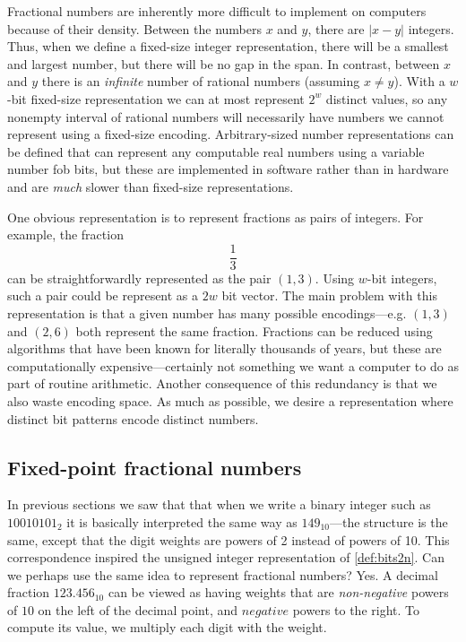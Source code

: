 Fractional numbers are inherently more difficult to implement on
computers because of their density.  Between the numbers $x$ and $y$,
there are $|x-y|$ integers.  Thus, when we define a fixed-size integer
representation, there will be a smallest and largest number, but there
will be no gap in the span.  In contrast, between $x$ and $y$ there is
an \emph{infinite} number of rational numbers (assuming $x\neq y$).
With a $w$-bit fixed-size representation we can at most represent
$2^{w}$ distinct values, so any nonempty interval of rational numbers
will necessarily have numbers we cannot represent using a fixed-size
encoding.  Arbitrary-sized number representations can be defined that
can represent any computable real numbers using a variable number fob
bits, but these are implemented in software rather than in hardware
and are \emph{much} slower than fixed-size representations.

One obvious representation is to represent fractions as pairs of
integers.  For example, the fraction
\[
  \frac{1}{3}
\]
can be straightforwardly represented as the pair $(1,3)$.  Using
$w$-bit integers, such a pair could be represent as a $2w$ bit vector.
The main problem with this representation is that a given number has
many possible encodings---e.g. $(1,3)$ and $(2,6)$ both represent the
same fraction.  Fractions can be reduced using algorithms that have
been known for literally thousands of years, but these are
computationally expensive---certainly not something we want a computer
to do as part of routine arithmetic.  Another consequence of this
redundancy is that we also waste encoding space.  As much as possible,
we desire a representation where distinct bit patterns encode distinct
numbers.

\subsection{Fixed-point fractional numbers}

In previous sections we saw that that when we write a binary integer
such as $10010101_{2}$ it is basically interpreted the same way as
$149_{10}$---the structure is the same, except that the digit weights
are powers of 2 instead of powers of 10.  This correspondence inspired
the unsigned integer representation of \cref{def:bits2n}.  Can we
perhaps use the same idea to represent fractional numbers?  Yes.  A
decimal fraction $123.456_{10}$ can be viewed as having weights that
are \emph{non-negative} powers of $10$ on the left of the decimal
point, and $negative$ powers to the right.  To compute its value, we
multiply each digit with the weight.

